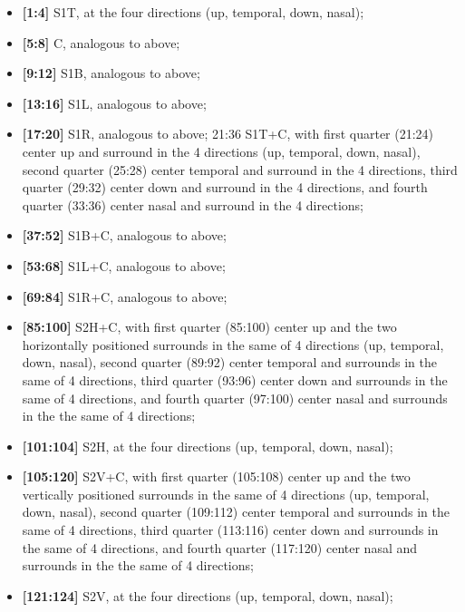 \begin{itemize}
\item \textbf{[1:4]} S1T, at the four directions (up, temporal, down, nasal); 
\item \textbf{[5:8]} C, analogous to above; 
\item \textbf{[9:12]} S1B, analogous to above;
\item \textbf{[13:16]} S1L, analogous to above;
\item \textbf{[17:20]} S1R, analogous to above; 
21:36 S1T+C, with first quarter (21:24) center up and surround in the 4 directions (up, temporal, down, nasal), second quarter (25:28) center temporal and surround in the 4 directions, third quarter (29:32) center down and surround in the 4 directions, and fourth quarter (33:36) center nasal and surround in the 4 directions;
\item \textbf{[37:52]} S1B+C, analogous to above;
\item \textbf{[53:68]} S1L+C, analogous to above;
\item \textbf{[69:84]} S1R+C, analogous to above;
\item \textbf{[85:100]} S2H+C, with first quarter (85:100) center up and the two horizontally positioned surrounds in the same of 4 directions (up, temporal, down, nasal), second quarter (89:92) center temporal and surrounds in the same of 4 directions, third quarter (93:96) center down and surrounds in the same of 4 directions, and fourth quarter (97:100) center nasal and surrounds in the the same of 4 directions;
\item \textbf{[101:104]} S2H, at the four directions (up, temporal, down, nasal);
\item \textbf{[105:120]} S2V+C, with first quarter (105:108) center up and the two vertically positioned surrounds in the same of 4 directions (up, temporal, down, nasal), second quarter (109:112) center temporal and surrounds in the same of 4 directions, third quarter (113:116) center down and surrounds in the same of 4 directions, and fourth quarter (117:120) center nasal and surrounds in the the same of 4 directions;
\item \textbf{[121:124]} S2V, at the four directions (up, temporal, down, nasal);
\end{itemize}